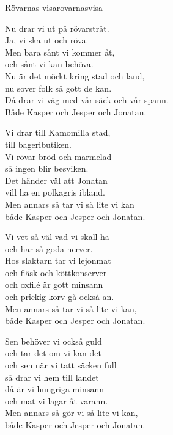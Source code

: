 \begin{song}{Rövarnas visa}{rovarnasvisa}
\begin{vers}
Nu drar vi ut på rövarstråt.\\
Ja, vi ska ut och röva.\\
Men bara sånt vi kommer åt,\\
och sånt vi kan behöva.\\
Nu är det mörkt kring stad och land,\\
nu sover folk så gott de kan.\\
Då drar vi väg med vår säck och vår spann.\\
Både Kasper och Jesper och Jonatan.\\
\end{vers}
\begin{vers}
Vi drar till Kamomilla stad,\\
till bageributiken.\\
Vi rövar bröd och marmelad\\
så ingen blir besviken.\\
Det händer väl att Jonatan\\
vill ha en polkagris ibland.\\
Men annars så tar vi så lite vi kan\\
både Kasper och Jesper och Jonatan.\\
\end{vers}
\newp
\begin{vers}
Vi vet så väl vad vi skall ha\\
och har så goda nerver.\\
Hos slaktarn tar vi lejonmat\\
och fläsk och köttkonserver\\
och oxfilé är gott minsann\\
och prickig korv gå också an.\\
Men annars så tar vi så lite vi kan,\\
både Kasper och Jesper och Jonatan.\\
\end{vers}
\begin{vers}
Sen behöver vi också guld\\
och tar det om vi kan det\\
och sen när vi tatt säcken full\\
så drar vi hem till landet\\
då är vi hungriga minsann\\
och mat vi lagar åt varann.\\
Men annars så gör vi så lite vi kan,\\
både Kasper och Jesper och Jonatan.\\
\end{vers}
\end{song}
